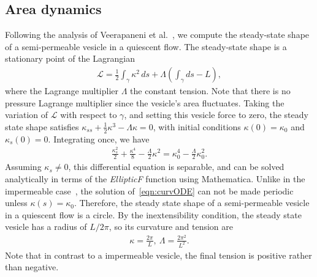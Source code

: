 \documentclass[9pt,twocolumn,twoside,lineno]{pnas-new}
\begin{document}
\subsection*{Area dynamics}
Following the analysis of Veerapaneni et al.~\cite{vee-raj-bir-pur2009},
we compute the steady-state shape of a semi-permeable vesicle in a
quiescent flow. The steady-state shape is a stationary point of the
Lagrangian
\begin{align}
  \mathcal{L} = \frac{1}{2}\int_{\gamma} \kappa^2 \, ds +
    \Lambda \left(\int_{\gamma} ds  - L \right),
\end{align}
where the Lagrange multiplier $\Lambda$ the constant tension. Note that
there is no pressure Lagrange multiplier since the vesicle's area
fluctuates. Taking the variation of $\mathcal{L}$ with respect to
$\gamma$, and setting this vesicle force to zero, the steady state shape
satisfies $\kappa_{ss} + \frac{1}{2}\kappa^3 - \Lambda \kappa = 0$,
with initial conditions $\kappa(0) = \kappa_0$ and $\kappa_s(0) = 0$.
Integrating once, we have
\begin{align}
  \frac{\kappa_s^2}{2} + \frac{\kappa^4}{8} - 
    \frac{\Lambda}{2}\kappa^2 = \kappa_0^4 - \frac{\Lambda}{2}\kappa_0^2.
  \label{eqn:curvODE}
\end{align}
Assuming $\kappa_s \neq 0$, this differential equation is separable, and
can be solved analytically in terms of the {\em EllipticF} function
using Mathematica. Unlike in the impermeable
case~\cite{vee-raj-bir-pur2009}, the solution of~\eqref{eqn:curvODE} can
not be made periodic unless $\kappa(s) = \kappa_0$. Therefore, the
steady state shape of a semi-permeable vesicle in a quiescent flow is a
circle. By the inextensibility condition, the steady state vesicle has a
radius of $L/2\pi$, so its curvature and tension are
\begin{align}
  \kappa = \frac{2\pi}{L}, \: \Lambda = \frac{2\pi^2}{L^2}.
  \label{eqn:SSshape}
\end{align}
Note that in contrast to a impermeable vesicle, the final tension is
positive rather than negative.
\end{document}
